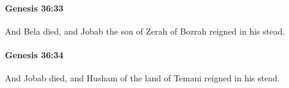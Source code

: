 		\paragraph{Genesis 36:33} %
			\label{GENESIS-36-33}

			And Bela died, and Jobab the son of Zerah of Bozrah reigned in his stead.


		\paragraph{Genesis 36:34} %
			\label{GENESIS-36-34}

			And Jobab died, and Husham of the land of Temani reigned in his stead.



